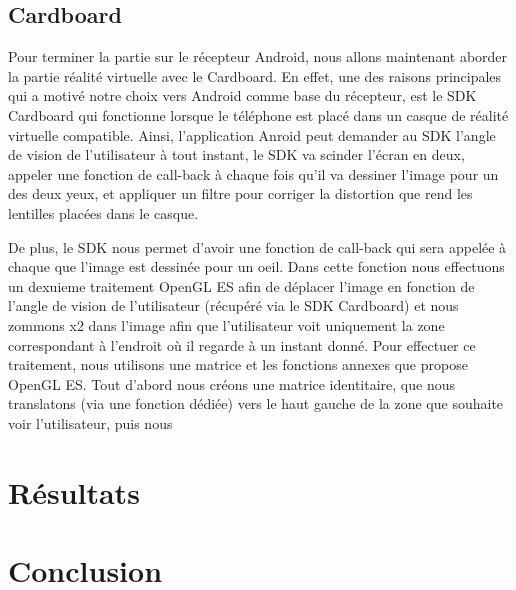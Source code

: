 \documentclass[11pt,a4paper]{article}
\begin{document}
\subsection{Cardboard}
Pour terminer la partie sur le récepteur Android, nous allons maintenant aborder la partie réalité virtuelle avec le Cardboard.
En effet, une des raisons principales qui a motivé notre choix vers Android comme base du récepteur, est le SDK Cardboard qui fonctionne lorsque le téléphone est placé dans un casque de réalité virtuelle compatible.
Ainsi, l'application Anroid peut demander au SDK l'angle de vision de l'utilisateur à tout instant, le SDK va scinder l'écran en deux, appeler une fonction de call-back à chaque fois qu'il va dessiner l'image pour un des deux yeux, et appliquer un filtre pour corriger la distortion que rend les lentilles placées dans le casque.


\bigbreak
De plus, le SDK nous permet d'avoir une fonction de call-back qui sera appelée à chaque que l'image est dessinée pour un oeil.
Dans cette fonction nous effectuons un dexuieme traitement OpenGL ES afin de déplacer l'image en fonction de l'angle de vision de l'utilisateur (récupéré via le SDK Cardboard) et nous zommons x2 dans l'image afin que l'utilisateur voit uniquement la zone correspondant à l'endroit où il regarde à un instant donné.
Pour effectuer ce traitement, nous utilisons une matrice et les fonctions annexes que propose OpenGL ES.
Tout d'abord nous créons une matrice identitaire, que nous translatons (via une fonction dédiée) vers le haut gauche de la zone que souhaite voir l'utilisateur, puis nous 


\section{Résultats}

\section{Conclusion}
\end{document}
